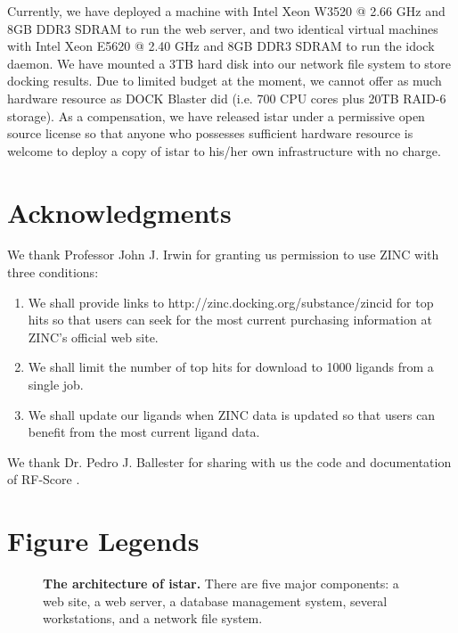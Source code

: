\documentclass[10pt]{article}
\begin{document}
Currently, we have deployed a machine with Intel Xeon W3520 @ 2.66 GHz and 8GB DDR3 SDRAM to run the web server, and two identical virtual machines with Intel Xeon E5620 @ 2.40 GHz and 8GB DDR3 SDRAM to run the idock daemon. We have mounted a 3TB hard disk into our network file system to store docking results. Due to limited budget at the moment, we cannot offer as much hardware resource as DOCK Blaster did (i.e. 700 CPU cores plus 20TB RAID-6 storage). As a compensation, we have released istar under a permissive open source license so that anyone who possesses sufficient hardware resource is welcome to deploy a copy of istar to his/her own infrastructure with no charge.

\section*{Acknowledgments}
We thank Professor John J. Irwin for granting us permission to use ZINC \cite{532,1178} with three conditions:
\begin{enumerate}
\item We shall provide links to http://zinc.docking.org/substance/zincid for top hits so that users can seek for the most current purchasing information at ZINC's official web site.
\item We shall limit the number of top hits for download to 1000 ligands from a single job.
\item We shall update our ligands when ZINC data is updated so that users can benefit from the most current ligand data.
\end{enumerate}
We thank Dr. Pedro J. Ballester for sharing with us the code and documentation of RF-Score \cite{564}.



\section*{Figure Legends}

\begin{figure}[!ht]
\begin{center}
\end{center}
\caption{
{\bf The architecture of istar.} There are five major components: a web site, a web server, a database management system, several workstations, and a network file system.
}
\label{Architecture}
\end{figure}
\end{document}
